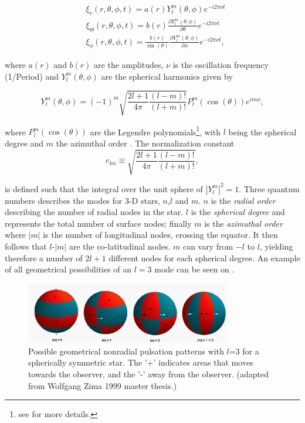 \begin{align}
    & \xi_r(r,\theta,\phi,t) = a(r)Y^{m}_l(\theta,\phi)e^{-i2\pi\nu t}  \\
    & \xi_\Theta(r,\theta,\phi,t) = b(r)\frac{\partial Y^{m}_l(\theta,\phi)}{\partial \theta}e^{-i2\pi\nu t}  \\
    & \xi_\phi(r,\theta,\phi,t) = \frac{b(r)}{\sin(\theta)}\frac{\partial Y^{m}_l(\theta,\phi)}{\partial \phi}e^{-i2\pi\nu t},
\end{align}

\noindent where $a(r)$ and $b(r)$ are the amplitudes, $\nu$ is the oscillation frequency (1/Period) and $Y^{m}_l(\theta,\phi)$ are the spherical harmonics given by 

\begin{equation}
\label{spherical}
    Y^{m}_l(\theta,\phi) = (-1)^{m}\sqrt{\frac{2l+1}{4\pi}\frac{(l-m)!}{(l+m)!}}P^{m}_l(\cos(\theta))e^{im\phi},
\end{equation}

\noindent where $P^{m}_l(\cos(\theta))$ are the Legendre polynomials\footnote{see \citet{aerts2010} for more details.}, with $l$ being the spherical degree and $m$ the azimuthal order . The normalization constant 
\begin{equation}
    c_{lm} \equiv \sqrt{\frac{2l+1}{4\pi}\frac{(l-m)!}{(l+m)!}},
\end{equation}

\noindent is defined such that the integral over the unit sphere of $|Y^{m}_l|^2 = 1 $. Three quantum numbers describes the modes for 3-D stars, $n$,$l$ and $m$. $n$ is the \textit{radial order} describing the number of radial nodes in the star. $l$ is the \textit{spherical degree} and represents the total number of surface nodes; finally $m$ is the \textit{azimuthal order} where $|m|$ is the number of longitudinal nodes, crossing the equator. It then follows that $l$-$|m|$ are the co-latitudinal nodes. $m$ can vary from $-l$ to $l$, yielding therefore a number of $2l+1$ different nodes for each spherical degree. An example of all geometrical possibilities of an $l=3$ mode can be seen on . 

\begin{figure}[t]
    \centering
    \includegraphics[width=0.8\textwidth]{nonradial.png}
    \caption{Possible geometrical nonradial pulsation patterns with $l$=3 for a spherically symmetric star. The '+' indicates areas that moves towards the observer, and the '-' away from the observer. \citep{antoci2011excitation} (adapted from Wolfgang Zima 1999 master thesis.)}
    \label{l3}
\end{figure}

